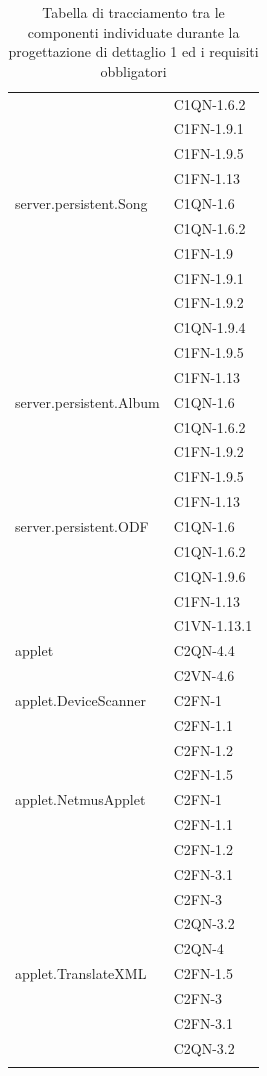 \begin{footnotesize}
\begin{longtable}[!h]{|l|l|}
& C1QN-1.6.2\\
& C1FN-1.9.1\\\
& C1FN-1.9.5\\
& C1FN-1.13\\\hline 
server.persistent.Song  & C1QN-1.6\\
& C1QN-1.6.2\\
& C1FN-1.9\\
& C1FN-1.9.1\\
& C1FN-1.9.2\\
& C1QN-1.9.4\\
& C1FN-1.9.5\\
& C1FN-1.13\\\hline 
server.persistent.Album  & C1QN-1.6\\
& C1QN-1.6.2\\
& C1FN-1.9.2\\
& C1FN-1.9.5\\
& C1FN-1.13\\\hline 
server.persistent.ODF  &  C1QN-1.6\\
& C1QN-1.6.2\\
& C1QN-1.9.6\\
& C1FN-1.13 \\
& C1VN-1.13.1\\\hline 
applet  &  C2QN-4.4\\
& C2VN-4.6 \\\hline
applet.DeviceScanner  &  C2FN-1\\
& C2FN-1.1\\
& C2FN-1.2\\
& C2FN-1.5\\\hline
applet.NetmusApplet  & C2FN-1 \\
& C2FN-1.1 \\
& C2FN-1.2 \\
& C2FN-3.1 \\
& C2FN-3\\
& C2QN-3.2\\
& C2QN-4\\\hline
applet.TranslateXML  &  C2FN-1.5 \\
& C2FN-3\\
& C2FN-3.1\\
& C2QN-3.2\\\hline
\caption{Tabella di tracciamento tra le componenti individuate durante la
progettazione di dettaglio 1 ed i requisiti obbligatori}
\end{longtable}
\end{footnotesize}

